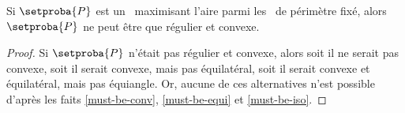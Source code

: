 

\begin{fact} \label{must-be-reg}
    Si $\setproba{P}$ est un \ngone\ maximisant l'aire parmi les \ngones\ de périmètre fixé, alors $\setproba{P}$ ne peut être que régulier et convexe.
\end{fact}


\begin{proof}
    Si $\setproba{P}$ n'était pas régulier et convexe, alors 
    soit il ne serait pas convexe, 
    soit il serait convexe, mais pas équilatéral, 
    soit il serait convexe et équilatéral, mais pas équiangle.
    Or, aucune de ces alternatives n'est possible d'après les faits \ref{must-be-conv}, \ref{must-be-equi} et \ref{must-be-iso}.
\end{proof}


%
%
%
%	
%
